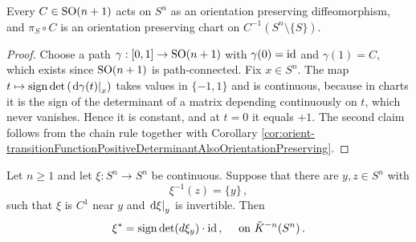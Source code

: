 \begin{lemma}\label{lem:orient-rotationsPreserveOrientation}
	Every $C\in\mathrm{SO}(n+1)$ acts on $S^n$ as an orientation preserving diffeomorphism,
	and $\pi_S\circ C$ is an orientation preserving chart on $C^{-1}(S^n\setminus\{S\})$.
\end{lemma}
\begin{proof}
	Choose a path $\gamma:[0,1]\to\mathrm{SO}(n+1)$ with $\gamma(0)=\operatorname{\mathrm{id}}$ and $\gamma(1)=C$,
	which exists since $\mathrm{SO}(n+1)$ is path-connected. Fix $x\in S^n$. The map
	$t\mapsto \mathrm{sign}\det\left(\left.\mathop{}\!\mathrm{d} \gamma(t)\right|_{x}\right)$ takes values in
	$\{-1,1\}$ and is continuous, because in charts it is the sign of the determinant
	of a matrix depending continuously on $t$, which never vanishes. Hence it is
	constant, and at $t=0$ it equals $+1$. The second claim follows from the chain
	rule together with Corollary \ref{cor:orient-transitionFunctionPositiveDeterminantAlsoOrientationPreserving}.
\end{proof}
\begin{lemma}\label{lem:orient-singleRegularPreimage}
Let $n\geq 1$ and let $\xi:S^n\to S^n$ be continuous. Suppose that there are $y,z\in S^n$ with 
\begin{equation*}
    \xi^{-1}(z)=\{y\}\,,
\end{equation*}such that $\xi$ is $C^1$ near $y$ and $\left.\mathop{}\!\mathrm{d} \xi\right|_{y}$ is invertible. Then
\begin{equation*}
    \xi^*=\mathrm{sign} \det(d\xi_y)\cdot \operatorname{\mathrm{id}}\,,\quad \text{ on }\tilde{K}^{-n}(S^n)\,.
\end{equation*}
\end{lemma}

